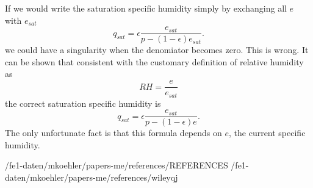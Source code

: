 \documentclass[a4paper,11pt]{article}
\begin{document}
If we would write the saturation specific humidity simply by exchanging all $e$ with $e_{sat}$ 
\begin{equation}
q_{sat} = \epsilon \frac{e_{sat}}{p-(1-\epsilon)e_{sat}}.
\end{equation}
we could have a singularity when the denomiator becomes zero.  This is wrong.  It can be shown 
that consistent with the customary definition of relative humidity as
\begin{equation}
RH = \frac{e}{e_{sat}}
\end{equation}
the correct saturation specific humidity is
\begin{equation}
q_{sat} = \epsilon \frac{e_{sat}}{p-(1-\epsilon)e}.
\end{equation}
The only unfortunate fact is that this formula depends on $e$, the current specific humidity. 



 {/fe1-daten/mkoehler/papers-me/references/REFERENCES}
 {/fe1-daten/mkoehler/papers-me/references/wileyqj} %
\end{document}
